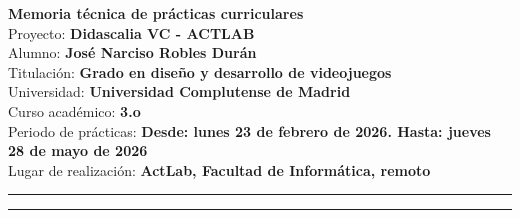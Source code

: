 \documentclass[a4paper,12pt]{article}
\begin{document}
	\pagestyle{fancy}
	\thispagestyle{empty}
	\fancyhead[L]{}

	\begin{center}
		\Large{\textbf{Memoria técnica de prácticas curriculares}}\\
		\vspace{0.35cm}
		\normalsize
		Proyecto: \textbf{Didascalia VC - ACTLAB}\\
		\vspace{0.15cm}
		Alumno: \textbf{José Narciso Robles Durán}\\
		Titulación: \textbf{Grado en diseño y desarrollo de videojuegos}\\
		Universidad: \textbf{Universidad Complutense de Madrid}\\
		Curso académico: \textbf{3.o}\\
		Periodo de prácticas: \textbf{Desde: lunes 23 de febrero de 2026. Hasta: jueves 28 de mayo de 2026}\\
		Lugar de realización: \textbf{ActLab, Facultad de Informática, remoto}\\
	\end{center}

	{\color{gray}\hrule}
	\vspace{0.3cm}

	\begin{abstract}
		
	\end{abstract}

	\vspace{0.2cm}
	{\color{gray}\hrule}

	\tableofcontents
	\newpage

	
	
	
	
	
	

	\appendix
	
\end{document}
